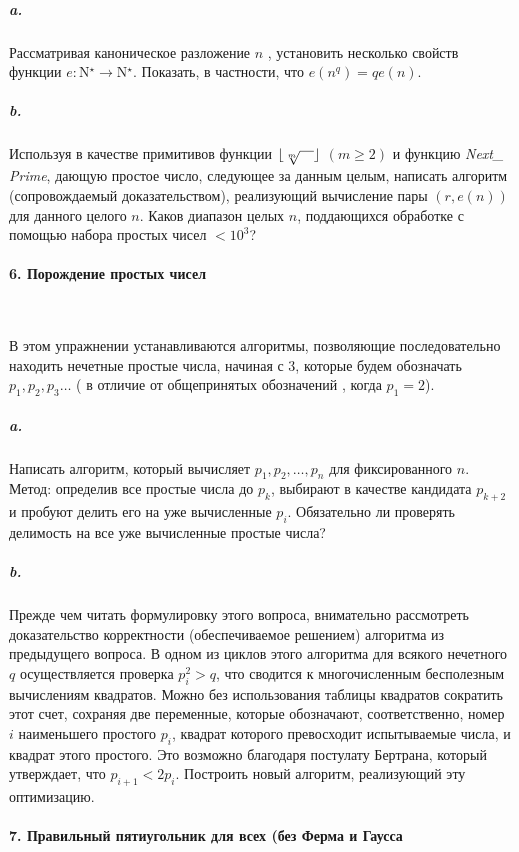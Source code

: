 \subparagraph { a.} Рассматривая каноническое разложение $n$ , установить несколько свойств функции $e:$N$^\star\rightarrow $N$^\star$. Показать, в частности, что $e\left({n^{q}}\right)=qe\left({n}\right)$.

\subparagraph { b.} Используя в качестве примитивов функции $\lfloor{\sqrt[m]{\hspace*{10pt}}}\rfloor$ $\left({m\geq {2}}\right)$ и функцию \textit{Next\_ Prime}, дающую простое число, следующее за данным целым, написать алгоритм (сопровождаемый доказательством), реализующий вычисление пары $\left({r,e\left({n}\right)}\right)$  для данного целого $n$. Каков диапазон целых $n$, поддающихся обработке с помощью набора простых чисел $<10^{3}$? 

\paragraph { 6. Порождение простых чисел}\ \newline

В этом упражнении устанавливаются алгоритмы, позволяющие последовательно находить нечетные простые числа, начиная с 3, которые будем обозначать $p_{1},p_{2},p_{3} \ldots $ ( в отличие от общепринятых обозначений , когда $p_{1}=2$). 

\subparagraph { a.} Написать алгоритм, который вычисляет $p_{1},p_{2},\ldots ,p_{n} $ для фиксированного $n$. Метод: определив все простые числа до $p_{k}$, выбирают в качестве кандидата $p_{k+2}$ и пробуют делить его на уже вычисленные $p_{i}$. Обязательно ли проверять делимость на все уже вычисленные простые числа?

\newpage
	

\subparagraph { b.} Прежде чем читать формулировку этого вопроса, внимательно рассмотреть доказательство корректности (обеспечиваемое решением) алгоритма из предыдущего вопроса. В одном из циклов этого алгоритма для всякого нечетного $q$ осуществляется проверка $p_i^2>q$, что сводится к многочисленным бесполезным вычислениям квадратов. Можно без использования таблицы квадратов сократить этот счет, сохраняя две переменные, которые обозначают, соответственно, номер $i$ наименьшего простого $p_{i}$, квадрат которого превосходит испытываемые числа, и квадрат этого простого. Это возможно благодаря постулату Бертрана, который утверждает, что $p_{i+1}<2p_{i}$. Построить новый алгоритм, реализующий эту оптимизацию. 

\paragraph { 7. Правильный пятиугольник для всех (без Ферма и Гаусса}\ \newline

